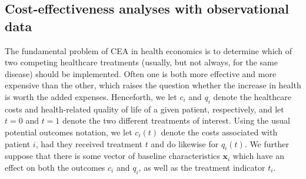 \documentclass[aoas,preprint]{imsart}
\theoremstyle{plain}
\theoremstyle{definition}
\theoremstyle{remark}
\begin{document}
\subsection{Cost-effectiveness analyses with observational data}\label{sec:CEA_theory}

The fundamental problem of CEA in health economics is to determine which of two competing healthcare treatments (usually, but not always, for the same disease) should be implemented. Often one is both more effective and more expensive than the other, which raises the question whether the increase in health is worth the added expenses. Henceforth, we let $c_i$ and $q_i$ denote the healthcare costs and health-related quality of life of a given patient, respectively, and let $t = 0$ and $t = 1$ denote the two different treatments of interest. Using the usual potential outcomes notation, we let $c_i(t)$ denote the costs associated with patient $i$, had they received treatment $t$ and do likewise for $q_i(t)$. We further suppose that there is some vector of baseline characteristics $\mathbf{x}_i$ which have an effect on both the outcomes $c_i$ and $q_i$, as well as the treatment indicator $t_i$.
\end{document}
